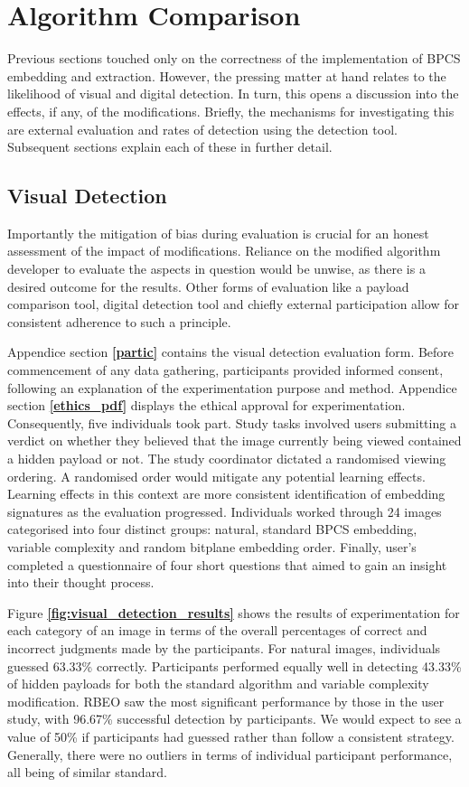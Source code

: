 \documentclass{l4proj}
\begin{document}
\section{Algorithm Comparison}

Previous sections touched only on the correctness of the implementation of BPCS embedding and extraction. However, the pressing matter at hand relates to the likelihood of visual and digital detection. In turn, this opens a discussion into the effects, if any, of the modifications. Briefly, the mechanisms for investigating this are external evaluation and rates of detection using the detection tool. Subsequent sections explain each of these in further detail.

\subsection{Visual Detection}

Importantly the mitigation of bias during evaluation is crucial for an honest assessment of the impact of modifications. Reliance on the modified algorithm developer to evaluate the aspects in question would be unwise, as there is a desired outcome for the results. Other forms of evaluation like a payload comparison tool, digital detection tool and chiefly external participation allow for consistent adherence to such a principle.

Appendice section \textbf{\ref{partic}} contains the visual detection evaluation form. Before commencement of any data gathering, participants provided informed consent, following an explanation of the experimentation purpose and method. Appendice section \textbf{\ref{ethics_pdf}} displays the ethical approval for experimentation. Consequently, five individuals took part. Study tasks involved users submitting a verdict on whether they believed that the image currently being viewed contained a hidden payload or not. The study coordinator dictated a randomised viewing ordering. A randomised order would mitigate any potential learning effects. Learning effects in this context are more consistent identification of embedding signatures as the evaluation progressed. Individuals worked through 24 images categorised into four distinct groups: natural, standard BPCS embedding, variable complexity and random bitplane embedding order. Finally, user's completed a questionnaire of four short questions that aimed to gain an insight into their thought process. 

Figure \textbf{\ref{fig:visual_detection_results}} shows the results of experimentation for each category of an image in terms of the overall percentages of correct and incorrect judgments made by the participants. For natural images, individuals guessed 63.33\% correctly. Participants performed equally well in detecting 43.33\% of hidden payloads for both the standard algorithm and variable complexity modification. RBEO saw the most significant performance by those in the user study, with 96.67\% successful detection by participants. We would expect to see a value of 50\% if participants had guessed rather than follow a consistent strategy. Generally, there were no outliers in terms of individual participant performance, all being of similar standard. 
\end{document}
